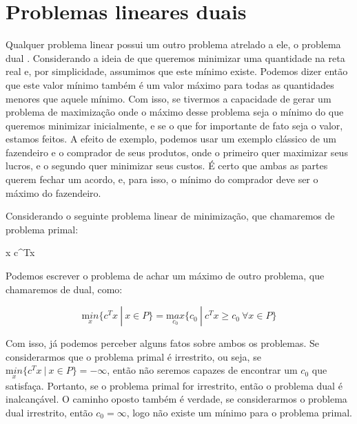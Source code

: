 \section{Problemas lineares duais}
\label{sec_prob_dual}
Qualquer problema linear possui um outro problema atrelado a ele, o problema dual \cite{fischetti2019}.
Considerando a ideia de que queremos minimizar uma quantidade na reta real e, por
simplicidade, assumimos que este mínimo existe. Podemos dizer então que este valor
mínimo também é um valor máximo para todas as quantidades menores que aquele mínimo. Com
isso, se tivermos a capacidade de gerar um problema de maximização onde o máximo desse
problema seja o mínimo do que queremos minimizar inicialmente, e se o que for importante de
fato seja o valor, estamos feitos. A efeito de exemplo, podemos usar um exemplo clássico de
um fazendeiro e o comprador de seus produtos, onde o primeiro quer maximizar seus lucros, e
o segundo quer minimizar seus custos. É certo que ambas as partes querem fechar um acordo, e,
para isso, o mínimo do comprador deve ser o máximo do fazendeiro.

Considerando o seguinte problema linear de minimização, que chamaremos de problema primal:

\vspace{-15pt}
\begin{mini!}
{x}{ c^Tx \label{duall_obj}}{\label{prob_duall}}{}
\end{mini!}

Podemos escrever o problema de achar um máximo de outro problema, que chamaremos de dual, como:

\begin{equation}
\underset{x}{\mathrm min}\{c^Tx\ |\ x \in P \} = \underset{c_0}{\mathrm max}\{c_0\ |\ c^Tx \geq c_0\ \forall x \in P\}
\end{equation}

Com isso, já podemos perceber alguns fatos sobre ambos os problemas. Se considerarmos que o
problema primal é irrestrito, ou seja, se \(\underset{x}{\mathrm min}\{c^Tx\ |\ x \in P\} = - \infty \),
então não seremos capazes de encontrar um \(c_0\) que satisfaça. Portanto, se o problema primal
for irrestrito, então o problema dual é inalcançável. O caminho oposto também é verdade, se
considerarmos o problema dual irrestrito, então \(c_0 = \infty\), logo não existe um mínimo para o problema
primal.

